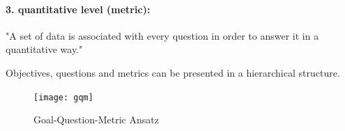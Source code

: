 \paragraph{3. quantitative level (metric):}
"A set of data is associated with every question in order to answer it in a quantitative way."
\cite[p. 3]{basili_goalquestionmetric_}

Objectives, questions and metrics can be presented in a hierarchical structure.

\begin{figure}[H] %
    \begin{tcolorbox}[arc=0pt,boxrule=0.5pt]
        \centering
        \texttt{[image: gqm]}
        \caption[GQM tree stucture ]{Goal-Question-Metric Ansatz \cite[p.
        3]{basili_goalquestionmetric_}}
        \label{fig:gqm}
    \end{tcolorbox}
\end{figure}

